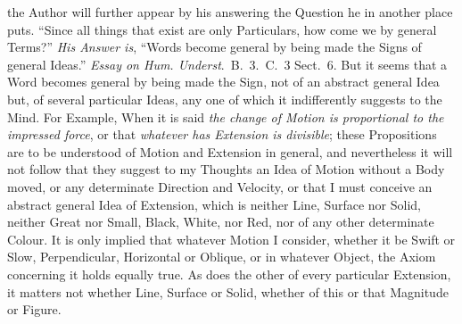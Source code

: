 \documentclass[]{article}
\newenvironment{sectionbody}{\begin{multicols}{2}}{\end{multicols}}
\begin{document}
\begin{sectionbody}
the Author will further appear by his answering the Question he
in another place puts.  ``Since all things that exist are only
Particulars, how come we by general Terms?''  \emph{His Answer
is}, ``Words become general by being made the Signs of
general Ideas.''
\emph{Essay on Hum. Underst}.\ B.~3.\ C.~3 Sect.~6.
But it seems that a Word becomes general by being made the Sign,
not of an abstract general Idea but, of several particular Ideas,
any one of which it indifferently suggests to the Mind.  For
Example, When it is said \emph{the change of Motion is proportional
to the impressed force}, or that \emph{whatever has Extension
is divisible}; these Propositions are to be understood of
Motion and Extension in general, and nevertheless it will not
follow that they suggest to my Thoughts an Idea of Motion without
a Body moved, or any determinate Direction and Velocity, or that
I must conceive an abstract general Idea of Extension, which is
neither Line, Surface nor Solid, neither Great nor Small, Black,
White, nor Red, nor of any other determinate Colour.  It is only
implied that whatever Motion I consider, whether it be Swift or
Slow, Perpendicular, Horizontal or Oblique, or in whatever
Object, the Axiom concerning it holds equally true.  As does the
other of every particular Extension, it matters not whether Line,
Surface or Solid, whether of this or that Magnitude or Figure.




\end{sectionbody}
\end{document}
